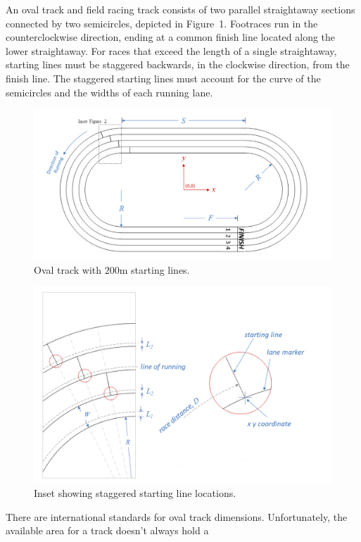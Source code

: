 
An oval track and field racing track consists of two parallel
straightaway sections connected by two semicircles, depicted in
Figure~1.  Footraces run in the counterclockwise direction, ending at
a common finish line located along the lower straightaway.  For races
that exceed the length of a single straightaway, starting lines must
be staggered backwards, in the clockwise direction, from the finish
line.  The staggered starting lines must account for the curve of the
semicircles and the widths of each running lane.
\begin{figure}[h]
	\begin{center}
		\includegraphics[width=.85\textwidth]{F1Stagger.png}
	\end{center}
\caption{Oval track with $200$m starting lines.}
\end{figure}
\begin{figure}[h]
	\begin{center}
		\includegraphics[width=.75\textwidth]{F2Stagger.png}
	\end{center}
\caption{Inset showing staggered starting line locations.}
\end{figure}
\par
There are international standards for oval track dimensions.
Unfortunately, the available area for a track doesn't always hold a
